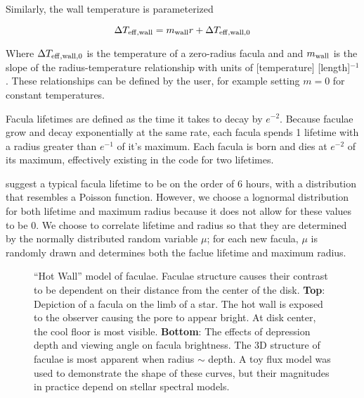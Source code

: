 \documentclass[twocolumn]{aastex631}
\begin{document}
Similarly, the wall temperature is parameterized

\begin{equation}
    \Delta T_{\rm eff,wall} = m_{\rm wall}r + \Delta T_{\rm eff,wall,0}
\end{equation}

Where $\Delta T_{\rm eff,wall,0}$ is the temperature of a zero-radius facula and and $m_{\rm wall}$ is the slope of the radius-temperature
relationship with units of [temperature] [length]$^{-1}$.
These relationships can be defined by the user, for example setting $m=0$ for constant temperatures.

Facula lifetimes are defined as the time it takes to decay by $e^{-2}$. Because faculae grow and decay exponentially
at the same rate, each facula spends 1 lifetime with a radius greater than $e^{-1}$ of it's maximum. Each facula is born
and dies at $e^{-2}$ of its maximum, effectively existing in the code for two lifetimes.

\citet{hovis-afflerbach2022} suggest a typical facula lifetime to be on the order of 6 hours,
with a distribution that resembles a Poisson function. However, we choose a lognormal distribution
for both lifetime and maximum radius because it does not allow for these values to be 0. We choose to
correlate lifetime and radius so that they are determined by the normally distributed random variable $\mu$;
for each new facula, $\mu$ is randomly drawn and determines both the faclue lifetime and maximum radius.

\begin{figure}
    \centering
    \caption{
        ``Hot Wall'' model of faculae. Faculae structure causes their contrast to be dependent on their distance
        from the center of the disk. {\bf Top}: Depiction of a facula on the limb of a star. The hot wall is exposed
        to the observer causing the pore to appear bright. At disk center, the cool floor is most visible. {\bf Bottom}:
        The effects of depression depth and viewing angle on facula brightness. The 3D structure of faculae is most apparent
        when radius $\sim$ depth. A toy flux model was used to demonstrate the shape of these curves, but their magnitudes
        in practice depend on stellar spectral models.
        }
    \label{fig:fac_struct}
\end{figure}
\end{document}
